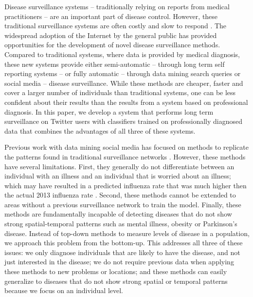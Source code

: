 \documentclass{acm_proc_article-sp}
\begin{document}
Disease surveillance systems -- traditionally relying on reports from medical practitioners -- are an important part of disease control. However, these traditional surveillance systems are often costly and slow to respond \cite{Chan2010,Heymann:2001,Salathe:2012ez}.  The widespread adoption of the Internet by the general public has provided opportunities for the development of novel disease surveillance methods. Compared to traditional systems, where data is provided by medical diagnosis, these new systems provide either semi-automatic -- through long term self reporting systems \cite{Marquet:2005tb,VanNoort:2007uk} -- or fully automatic -- through data mining search queries or social media \cite{Bodnar:2013we,Butler:2013uh,Culotta:2010hx,Goel:2010jf,Olson:2013bo} -- disease surveillance. While these methods are cheaper, faster and cover a larger number of individuals than traditional systems, one can be less confident about their results than the results from a system based on professional diagnosis. In this paper, we develop a system that performs long term surveillance on Twitter users with classifiers trained on professionally diagnosed data that combines the advantages of all three of these systems.

Previous work with data mining social media has focused on methods to replicate the patterns found in traditional surveillance networks \cite{Bodnar:2013we,Culotta:2010hx,Goel:2010jf}. However, these methods have several limitations. First, they generally do not differentiate between an individual with an illness and an individual that is worried about an illness; which may have resulted in a predicted influenza rate that was much higher then the actual 2013 influenza rate \cite{Bodnar:2013we,Butler:2013uh,Lamb:2013to,Olson:2013bo}. Second, these methods cannot be extended to areas without a previous surveillance network to train the model. Finally, these methods are fundamentally incapable of detecting diseases that do not show strong spatial-temporal patterns such as mental illness, obesity or Parkinson's disease. Instead of top-down methods to measure levels of disease in a population, we approach this problem from the bottom-up. This addresses all three of these issues: we only diagnose individuals that are likely to have the disease, and not just interested in the disease; we do not require previous data when applying these methods to new problems or locations; and these methods can easily generalize to diseases that do not show strong spatial or temporal patterns because we focus on an individual level.
\end{document}
